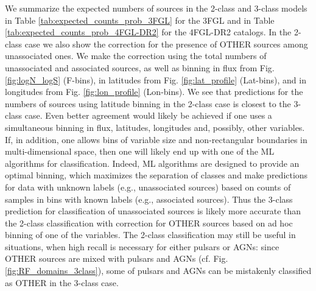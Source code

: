 \documentclass{aa}
\begin{document}
We summarize the expected numbers of sources in the 2-class and 3-class models in Table \ref{tab:expected_counts_prob_3FGL} for the 3FGL and in Table \ref{tab:expected_counts_prob_4FGL-DR2} for the 4FGL-DR2 catalogs.
In the 2-class case we also show the correction for the presence of OTHER sources among unassociated ones.
We make the correction using the total numbers of unassociated and associated sources, as well as binning in flux from Fig. \ref{fig:logN_logS} (F-bins), in latitudes from Fig. \ref{fig:lat_profile} (Lat-bins), and in longitudes from Fig. \ref{fig:lon_profile} (Lon-bins).
We see that predictions for the numbers of sources using latitude binning in the 2-class case is closest to the 3-class case.
Even better agreement would likely be achieved if one uses a simultaneous binning in flux, latitudes, longitudes and, possibly, other variables.
If, in addition, one allows bins of variable size and non-rectangular boundaries in multi-dimensional space, then one will likely end up with one of the ML algorithms for classification.
Indeed, ML algorithms are designed to provide an optimal binning, which maximizes the separation of classes and make predictions for data with unknown labels (e.g., unassociated sources) based on counts of samples in bins with known labels (e.g., associated sources).
Thus the 3-class prediction for classification of unassociated sources is likely more accurate than the 2-class classification with correction for OTHER sources based on ad hoc binning of one of the variables.
The 2-class classification may still be useful in situations, when high recall is necessary for either pulsars or AGNs:
since OTHER sources are mixed with pulsars and AGNs (cf. Fig. \ref{fig:RF_domains_3class}), 
some of pulsars and AGNs can be mistakenly classified as OTHER in the 3-class case.
\end{document}
